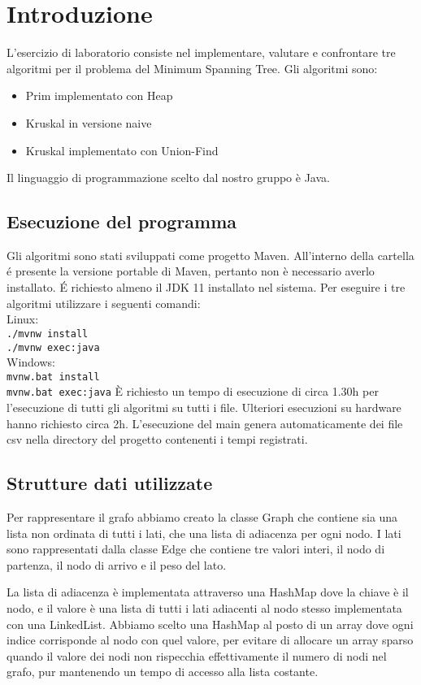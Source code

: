 \section{Introduzione}

L'esercizio di laboratorio consiste nel implementare, valutare e confrontare tre algoritmi per il problema del Minimum Spanning Tree. Gli algoritmi sono:
\begin{itemize}
	\item Prim implementato con Heap
	\item Kruskal in versione naive
	\item Kruskal implementato con Union-Find
\end{itemize}
Il linguaggio di programmazione scelto dal nostro gruppo è Java.

\subsection{Esecuzione del programma}
Gli algoritmi sono stati sviluppati come progetto Maven. All'interno della cartella \'e presente la versione portable di Maven, pertanto non è necessario averlo installato. \'E
richiesto almeno il JDK 11 installato nel sistema.
Per eseguire i tre algoritmi utilizzare i seguenti comandi:\\
Linux:\\
\indent \texttt{./mvnw install}\\
\indent \texttt{./mvnw exec:java}\\
Windows:\\
\indent \texttt{mvnw.bat install}\\
\indent \texttt{mvnw.bat exec:java}
\uppercase{è} richiesto un tempo di esecuzione di circa 1.30h per l'esecuzione di tutti gli algoritmi su tutti i file. Ulteriori esecuzioni su hardware hanno richiesto circa 2h.
L'esecuzione del main genera automaticamente dei file csv nella directory del progetto contenenti i tempi registrati.
\subsection{Strutture dati utilizzate}

Per rappresentare il grafo abbiamo creato la classe Graph che contiene sia una lista non ordinata di tutti i lati, che una lista di adiacenza per ogni nodo.
I lati sono rappresentati dalla classe Edge che contiene tre valori interi, il nodo di partenza, il nodo di arrivo e il peso del lato.

La lista di adiacenza è implementata attraverso una HashMap dove la chiave è il nodo, e il valore è una lista di tutti i lati adiacenti al nodo stesso implementata con una LinkedList. Abbiamo scelto una HashMap al posto di un array dove ogni indice corrisponde al nodo con quel valore, per evitare di allocare un array sparso quando il valore dei nodi non rispecchia effettivamente il numero di nodi nel grafo, pur mantenendo un tempo di accesso alla lista costante.


